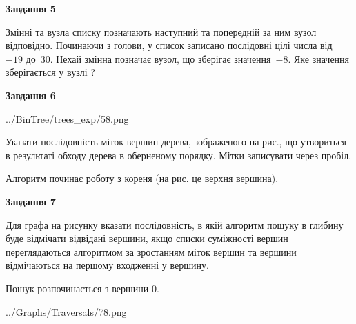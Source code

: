 \documentclass[12pt, ukrainian]{article}
\begin{document}
{\begin {large}
{\begin {center}\textbf{Завдання 5}\end {center}}\par
Змінні  та  вузла списку позначають наступний та попередній за ним вузол відповідно. Починаючи з голови, у список записано послідовні цілі числа від~$-19$ до~$30$. Нехай змінна  позначає вузол, що зберігає значення~$-8$.
Яке значення зберігається у вузлі  ?\par
\newpage

{\begin {center}\textbf{Завдання 6}\end {center}}\par

\begin{center}
	{../BinTree/trees_exp/58.png}
\end{center}
Указати послідовність міток вершин дерева, зображеного на рис., що утвориться в результаті обходу дерева в оберненому порядку. Мітки записувати через пробіл.\par Алгоритм починає роботу з кореня (на рис. це верхня вершина).\par
\newpage

{\begin {center}\textbf{Завдання 7}\end {center}}\par
Для графа на рисунку вказати послідовність, в якій алгоритм пошуку в глибину буде відмічати відвідані вершини, якщо списки суміжності вершин переглядаються алгоритмом за зростанням міток вершин та вершини відмічаються на першому вход\-женні у вершину.\par
Пошук розпочинається з вершини 0.\par

\begin{center}
	{../Graphs/Traversals/78.png}
\end{center}\par
\newpage


\end{large}}
\end{document}
